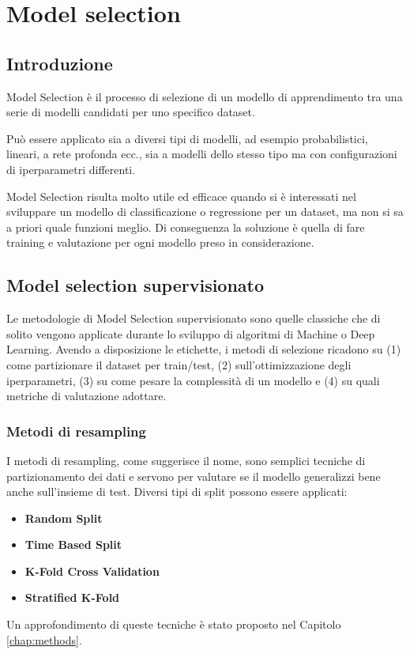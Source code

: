 \chapter{Model selection}
\label{chap:modelselection}

\section{Introduzione}
Model Selection è il processo di selezione di un modello di apprendimento tra una serie di modelli candidati per uno specifico dataset.

Può essere applicato sia a diversi tipi di modelli, ad esempio probabilistici, lineari, a rete profonda ecc., sia a modelli dello stesso tipo ma con configurazioni di iperparametri differenti.

Model Selection risulta molto utile ed efficace quando si è interessati nel sviluppare un modello di classificazione o regressione per un dataset, ma non si sa a priori quale funzioni meglio. Di conseguenza la soluzione è quella di fare training e valutazione per ogni modello preso in considerazione.

\section{Model selection supervisionato}
Le metodologie di Model Selection supervisionato sono quelle classiche che di solito vengono applicate durante lo sviluppo di algoritmi di Machine o Deep Learning. Avendo a disposizione le etichette, i metodi di selezione ricadono su (1) come partizionare il dataset per train/test, (2) sull'ottimizzazione degli iperparametri, (3) su come pesare la complessità di un modello e (4) su quali metriche di valutazione adottare.

\subsection{Metodi di resampling}
I metodi di resampling, come suggerisce il nome, sono semplici tecniche di partizionamento dei dati e servono per valutare se il modello generalizzi bene anche sull'insieme di test. Diversi tipi di split possono essere applicati:
\begin{itemize}
	\item \textbf{Random Split}
	\item \textbf{Time Based Split} 
	\item \textbf{K-Fold Cross Validation}
	\item \textbf{Stratified K-Fold}
\end{itemize}
Un approfondimento di queste tecniche è stato proposto nel Capitolo \ref{chap:methods}.

